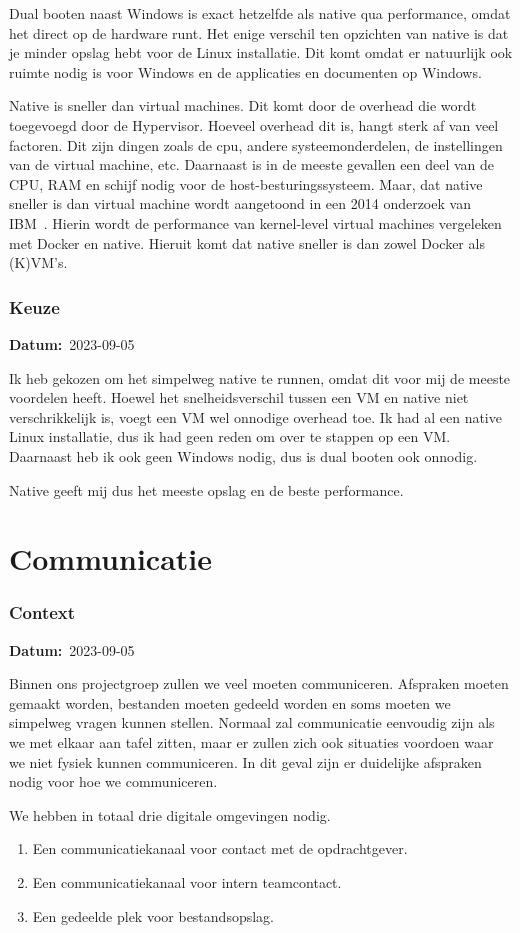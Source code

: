 \documentclass[a4paper]{report}
\newcommand{\teambox}{
  \begin{tcolorbox}[hbox, colback=blue!5!white,colframe=blue!75!black,
    left=.1mm, right=.1mm, top=.1mm, bottom=.1mm, fontupper=\scriptsize\sffamily]
    Team Keuze
  \end{tcolorbox}
}
\newcommand{\teamchoice}[1]{
  \section[ #1 ]{#1~\mbox{\raisebox{-2.5pt}{\teambox}}}
}
\newcommand{\timestamp}[1]{
  \mbox{\scriptsize \textbf{Datum:} #1} \smallbreak
}
\begin{document}
Dual booten naast Windows is exact hetzelfde als native qua performance, omdat het direct op de hardware runt. 
Het enige verschil ten opzichten van native is dat je minder opslag hebt voor de Linux installatie. Dit komt omdat er natuurlijk ook ruimte nodig is voor Windows en de applicaties en documenten op Windows. 
\par\smallskip
Native is sneller dan virtual machines. Dit komt door de overhead die wordt toegevoegd door de Hypervisor. 
Hoeveel overhead dit is, hangt sterk af van veel factoren. Dit zijn dingen zoals de cpu, andere systeemonderdelen, de instellingen van de virtual machine, etc. 
Daarnaast is in de meeste gevallen een deel van de CPU, RAM en schijf nodig voor de host-besturingssysteem.
Maar, dat native sneller is dan virtual machine wordt aangetoond in een 2014 onderzoek van IBM~\cite{felter2015updated}.
Hierin wordt de performance van kernel-level virtual machines vergeleken met Docker en native. 
Hieruit komt dat native sneller is dan zowel Docker als (K)VM's. 

\subsubsection{Keuze}
\timestamp{2023-09-05}
Ik heb gekozen om het simpelweg native te runnen, omdat dit voor mij de meeste voordelen heeft.
Hoewel het snelheidsverschil tussen een VM en native niet verschrikkelijk is, voegt een VM wel onnodige overhead toe. 
Ik had al een native Linux installatie, dus ik had geen reden om over te stappen op een VM. 
Daarnaast heb ik ook geen Windows nodig, dus is dual booten ook onnodig. 
\par\smallskip
Native geeft mij dus het meeste opslag en de beste performance. 


\teamchoice{Communicatie}
\subsubsection{Context}
\timestamp{2023-09-05}
Binnen ons projectgroep zullen we veel moeten communiceren. Afspraken moeten gemaakt worden, bestanden moeten gedeeld worden en soms moeten we simpelweg vragen kunnen stellen.
Normaal zal communicatie eenvoudig zijn als we met elkaar aan tafel zitten, maar er zullen zich ook situaties voordoen waar we niet fysiek kunnen communiceren.
In dit geval zijn er duidelijke afspraken nodig voor hoe we communiceren.
\par \smallskip 
We hebben in totaal drie digitale omgevingen nodig.
\begin{enumerate}
  \item Een communicatiekanaal voor contact met de opdrachtgever.
  \item Een communicatiekanaal voor intern teamcontact.
  \item Een gedeelde plek voor bestandsopslag.
\end{enumerate}
\end{document}
